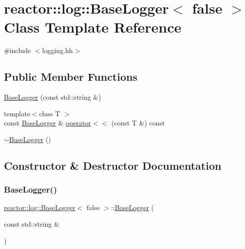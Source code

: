 \hypertarget{classreactor_1_1log_1_1BaseLogger_3_01false_01_4}{}\section{reactor\+:\+:log\+:\+:Base\+Logger$<$ false $>$ Class Template Reference}
\label{classreactor_1_1log_1_1BaseLogger_3_01false_01_4}


{\ttfamily \#include $<$logging.\+hh$>$}

\subsection*{Public Member Functions}
\begin{DoxyCompactItemize}
\item 
\hyperlink{classreactor_1_1log_1_1BaseLogger_3_01false_01_4_a573e2132fc169e4187df6965c5702d30}{Base\+Logger} (const std\+::string \&)
\item 
{\footnotesize template$<$class T $>$ }\\const \hyperlink{classreactor_1_1log_1_1BaseLogger}{Base\+Logger} \& \hyperlink{classreactor_1_1log_1_1BaseLogger_3_01false_01_4_a871b558bb1f64ed564deb55a1286d56c}{operator$<$$<$} (const T \&) const
\item 
\hyperlink{classreactor_1_1log_1_1BaseLogger_3_01false_01_4_a3b4c1ce4ef1f745c151fbbafceba3013}{$\sim$\+Base\+Logger} ()
\end{DoxyCompactItemize}


\subsection{Constructor \& Destructor Documentation}
\mbox{\label{classreactor_1_1log_1_1BaseLogger_3_01false_01_4_a573e2132fc169e4187df6965c5702d30}} 
\subsubsection{\texorpdfstring{Base\+Logger()}{BaseLogger()}}
{\footnotesize\ttfamily \hyperlink{classreactor_1_1log_1_1BaseLogger}{reactor\+::log\+::\+Base\+Logger}$<$ false $>$\+::\hyperlink{classreactor_1_1log_1_1BaseLogger}{Base\+Logger} (\begin{DoxyParamCaption}\item[{const std\+::string \&}]{ }\end{DoxyParamCaption})\hspace{0.3cm}{\ttfamily [inline]}}

